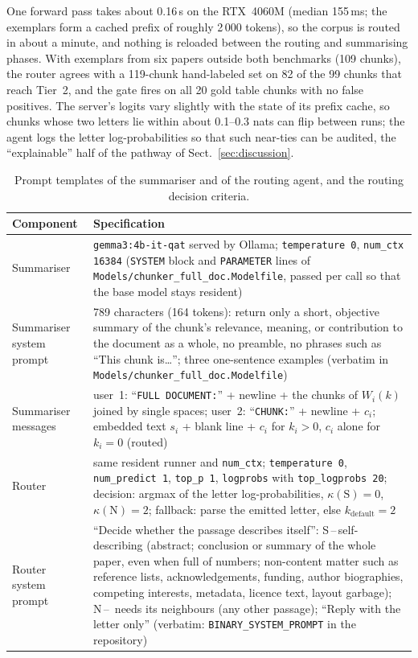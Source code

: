 \documentclass[pdflatex,sn-mathphys-num]{sn-jnl}
\theoremstyle{thmstyleone}%
\theoremstyle{thmstylethree}%
\begin{document}
One forward pass takes about 0.16\,s on the RTX~4060M (median 155\,ms; the exemplars form a cached prefix of roughly 2\,000 tokens), so the corpus is routed in about a minute, and nothing is reloaded between the routing and summarising phases. With exemplars from six papers outside both benchmarks (109 chunks), the router agrees with a 119-chunk hand-labeled set on 82 of the 99 chunks that reach Tier~2, and the gate fires on all 20 gold table chunks with no false positives. The server's logits vary slightly with the state of its prefix cache, so chunks whose two letters lie within about 0.1--0.3 nats can flip between runs; the agent logs the letter log-probabilities so that such near-ties can be audited, the ``explainable'' half of the pathway of Sect.~\ref{sec:discussion}.

\begin{table}[htbp]
\caption{Prompt templates of the summariser and of the routing agent, and the routing decision criteria.}\label{tab:prompts}
\begin{tabular}{@{}p{2.6cm}p{10.0cm}@{}}
\toprule
Component & Specification \\
\midrule
Summariser & \texttt{gemma3:4b-it-qat} served by Ollama; \texttt{temperature 0}, \texttt{num\_ctx 16384} (\texttt{SYSTEM} block and \texttt{PARAMETER} lines of \texttt{Models/chunker\_full\_doc.Modelfile}, passed per call so that the base model stays resident) \\
Summariser system prompt & 789 characters (164 tokens): return only a short, objective summary of the chunk's relevance, meaning, or contribution to the document as a whole, no preamble, no phrases such as ``This chunk is\ldots''; three one-sentence examples (verbatim in \texttt{Models/chunker\_full\_doc.Modelfile}) \\
Summariser messages & user~1: ``\texttt{FULL DOCUMENT:}'' + newline + the chunks of $W_i(k)$ joined by single spaces; user~2: ``\texttt{CHUNK:}'' + newline + $c_i$; embedded text $s_i$ + blank line + $c_i$ for $k_i>0$, $c_i$ alone for $k_i=0$ (routed) \\
Router & same resident runner and \texttt{num\_ctx}; \texttt{temperature 0}, \texttt{num\_predict 1}, \texttt{top\_p 1}, \texttt{logprobs} with \texttt{top\_logprobs 20}; decision: argmax of the letter log-probabilities, $\kappa(\mathrm S)=0$, $\kappa(\mathrm N)=2$; fallback: parse the emitted letter, else $k_{\mathrm{default}}=2$ \\
Router system prompt & ``Decide whether the passage describes itself'': S\,--\,self-describing (abstract; conclusion or summary of the whole paper, even when full of numbers; non-content matter such as reference lists, acknowledgements, funding, author biographies, competing interests, metadata, licence text, layout garbage); N\,--\, needs its neighbours (any other passage); ``Reply with the letter only'' (verbatim: \texttt{BINARY\_SYSTEM\_PROMPT} in the repository) \\

\end{tabular}
\end{table}
\end{document}
